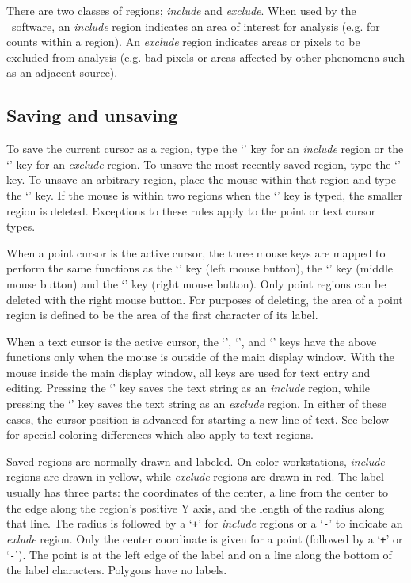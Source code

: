There are two classes of regions; {\em include} and {\em exclude}.  When used by
the \PROS\ software, an {\em include} region indicates an area of interest
for analysis (e.g. for counts within a region).  An {\em exclude} region
indicates areas or pixels to be excluded from analysis (e.g. bad
pixels or areas affected by other phenomena such as an adjacent source).

\subsection{ Saving and unsaving }

To save the current cursor as a region, type the `' key for
an {\em include}
region or the `' key for an {\em exclude} region.  To unsave the most
recently saved region, type the `' key.  To unsave an arbitrary
region, place the mouse within that region and type the `' key.  If
the mouse is within two regions when the `' key is typed, the smaller
region is deleted.  Exceptions to these rules apply to the point
or text cursor types.

When a point cursor is the active cursor, the three mouse keys are
mapped to perform the same functions as the `' key (left mouse button),
the `' key (middle mouse button) and the `' key (right mouse button).
Only point regions can be deleted with the right mouse button.  For
purposes of deleting, the area of a point region is defined to be the
area of the first character of its label.

When a text cursor is the active cursor, the `', `', and `'
keys have the above functions only when the mouse is outside of the
main display window.  With the mouse inside the main display window,
all keys are used for text entry and editing.  Pressing the `' key
saves the text string as an {\em include} region, while pressing
the `' key saves the
text string as an {\em exclude} region.  In either of these cases, the cursor
position is advanced for starting a new line of text.  See below for
special coloring differences which also apply to text regions.

Saved regions are normally drawn and labeled.  On color workstations,
{\em include} regions are drawn in yellow, while {\em exclude} regions are drawn in
red.  The label usually has three parts: the coordinates of the center,
a line from the center to the edge along the region's positive Y axis,
and the length of the radius along that line.  The radius is followed by
a `{\tt +}' for {\em include} regions or a `{\tt -}' to indicate an {\em exlude} region.  Only
the center coordinate is given for a point (followed by a `{\tt +}' or `{\tt -}').
The point is at the left edge of the label and on a line along the
bottom of the label characters.  Polygons have no labels.

